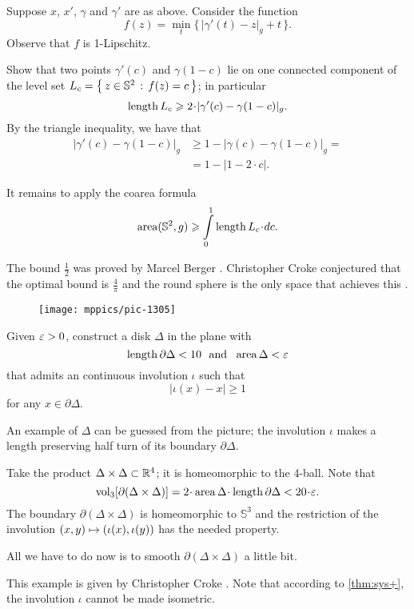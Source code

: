 Suppose $x$, $x'$, $\gamma$ and $\gamma'$ are as above.
Consider the function
\[f(z)=\min_t \{\,|\gamma'(t)-z|_g+t\,\}.\]
Observe that $f$ is 1-Lipschitz.

Show that two points $\gamma'(c)$ and $\gamma(1-c)$ lie on one connected component of the level set $L_c=\left\{\,{z\in\mathbb{S}^2}\,:\,{f(z)=c}\,\right\}$;
in particular 
\[\length L_c\ge 2\cdot|\gamma'(c)-\gamma(1-c)|_g.\]
By the triangle inequality, we have that
\begin{align*}
|\gamma'(c)-\gamma(1-c)|_g&\ge 1-|\gamma(c)-\gamma(1-c)|_g=
\\
&=1-|1-2\cdot c|.
\end{align*}

It remains to apply the coarea formula
\[\area(\mathbb{S}^2,g)\ge \int\limits_0^1\length L_c\cdot dc.\]

The bound $\tfrac12$ was proved by Marcel Berger \cite{berger}. 
Christopher Croke conjectured that the optimal bound is $\tfrac4\pi$ and the round sphere is the only space that achieves this \cite[Conjecture 0.3 in][]{croke}.

\begin{wrapfigure}{r}{20 mm}
\vskip-0mm
\centering
\texttt{[image: mppics/pic-1305]}
\end{wrapfigure}

Given $\varepsilon>0$, construct a disk $\Delta$ in the plane with 
\[\mathop{\rm length}\nolimits\partial \Delta<10\ \ \text{and}\ \ \operatorname{\rm area}\nolimits \Delta<\varepsilon\]
that admits an continuous involution $\iota$ such that 
\[|\iota(x)-x|\ge 1\]
for any $x\in\partial \Delta$.

An example of $\Delta$ can be guessed from the picture;
the involution $\iota$ makes a length preserving half turn of its boundary $\partial \Delta$.


Take the product $\Delta\times \Delta\subset \mathbb{R}^4$;
it is homeomorphic to the 4-ball.
Note that 
$$\vol_3[\partial(\Delta\times \Delta)]=2\cdot\area \Delta\cdot\length \partial \Delta<20\cdot\eps.$$
The boundary $\partial(\Delta\times \Delta)$ is homeomorphic to $\mathbb{S}^3$
and the restriction of the involution $(x,y)\z\mapsto (\iota(x),\iota(y))$ has the needed property.

All we have to do now is to smooth $\partial(\Delta\times \Delta)$ a little bit.

 This example is given by Christopher Croke \cite{croke}.
Note that according to \ref{thm:sys+}, 
the involution $\iota$ cannot be made isometric.

